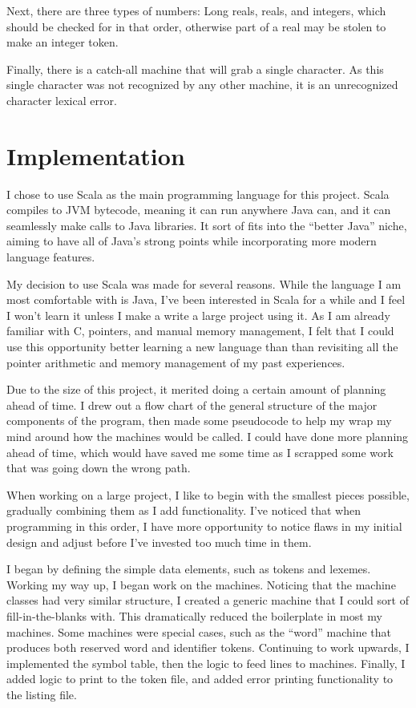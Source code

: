 \documentclass[paper=letter, fontsize=11pt, oneside, titlepage]{scrartcl}
\begin{document}
Next, there are three types of numbers: Long reals, reals, and integers, which should be checked for in that order, otherwise part of a real may be stolen to make an integer token.

Finally, there is a catch-all machine that will grab a single character. As this single character was not recognized by any other machine, it is an unrecognized character lexical error.

\section{Implementation}\label{impl}

I chose to use Scala as the main programming language for this project.  Scala compiles to JVM bytecode, meaning it can run anywhere Java can, and it can seamlessly make calls to Java libraries.  It sort of fits into the ``better Java'' niche, aiming to have all of Java's strong points while incorporating more modern language features.

My decision to use Scala was made for several reasons.  While the language I am most comfortable with is Java, I've been interested in Scala for a while and I feel I won't learn it unless I make a write a large project using it.  As I am already familiar with C, pointers, and manual memory management, I felt that I could use this opportunity better learning a new language than than revisiting all the pointer arithmetic and memory management of my past experiences.  

Due to the size of this project, it merited doing a certain amount of planning ahead of time.  I drew out a flow chart of the general structure of the major components of the program, then made some pseudocode to help my wrap my mind around how the machines would be called.  I could have done more planning ahead of time, which would have saved me some time as I scrapped some work that was going down the wrong path.

When working on a large project, I like to begin with the smallest pieces possible, gradually combining them as I add functionality.  I've noticed that when programming in this order, I have more opportunity to notice flaws in my initial design and adjust before I've invested too much time in them.

I began by defining the simple data elements, such as tokens and lexemes. Working my way up, I began work on the machines.  Noticing that the machine classes had very similar structure, I created a generic machine that I could sort of fill-in-the-blanks with.  This dramatically reduced the boilerplate in most my machines. Some machines were special cases, such as the ``word'' machine that produces both reserved word and identifier tokens.  Continuing to work upwards, I implemented the symbol table, then the logic to feed lines to machines.  Finally, I added logic to print to the token file, and added error printing functionality to the listing file.
\end{document}
